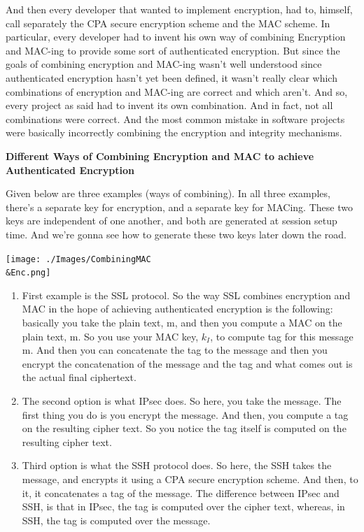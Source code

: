 \documentclass[11pt]{article}
\begin{document}
And then every developer that wanted to implement encryption, had to,
himself, call separately the CPA secure encryption scheme and the MAC
scheme. In particular, every developer had to invent his own way of
combining Encryption and MAC-ing to provide some sort of authenticated
encryption. But since the goals of combining encryption and MAC-ing
wasn't well understood since authenticated encryption hasn't yet been
defined, it wasn't really clear which combinations of encryption and
MAC-ing are correct and which aren't. And so, every project as said had
to invent its own combination. And in fact, not all combinations were
correct. And the most common mistake in software projects were basically
incorrectly combining the encryption and integrity mechanisms.

\textbf{Different Ways of Combining Encryption and MAC to achieve
Authenticated Encryption}

Given below are three examples (ways of combining). In all three
examples, there's a separate key for encryption, and a separate key for
MACing. These two keys are independent of one another, and both are
generated at session setup time. And we're gonna see how to generate
these two keys later down the road.

\texttt{[image: ./Images/CombiningMAC\\\&Enc.png]}

\begin{enumerate}
\def\labelenumi{\arabic{enumi}.}
\item
  First example is the SSL protocol. So the way SSL combines encryption
  and MAC in the hope of achieving authenticated encryption is the
  following: basically you take the plain text, m, and then you compute
  a MAC on the plain text, m. So you use your MAC key, \(k_{I}\), to
  compute tag for this message m. And then you can concatenate the tag
  to the message and then you encrypt the concatenation of the message
  and the tag and what comes out is the actual final ciphertext.
\item
  The second option is what IPsec does. So here, you take the message.
  The first thing you do is you encrypt the message. And then, you
  compute a tag on the resulting cipher text. So you notice the tag
  itself is computed on the resulting cipher text. 
\item
  Third option is what the SSH protocol does. So here, the SSH takes the
  message, and encrypts it using a CPA secure encryption scheme. And
  then, to it, it concatenates a tag of the message. The difference
  between IPsec and SSH, is that in IPsec, the tag is computed over the
  cipher text, whereas, in SSH, the tag is computed over the message.
\end{enumerate}
\end{document}
